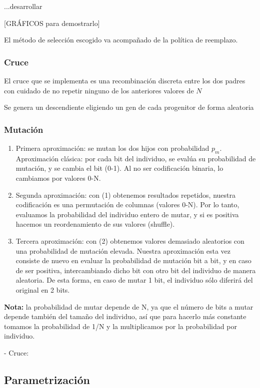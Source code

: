 \documentclass[12pt]{article}
\begin{document}
...desarrollar

[GRÁFICOS para demostrarlo]

El método de selección escogido va acompañado de la política de reemplazo.

\subsubsection{Cruce}

El cruce que se implementa es una recombinación discreta entre los dos padres con cuidado de no repetir ninguno de los anteriores valores de $N$ 

Se genera un descendiente eligiendo un gen de cada progenitor de forma aleatoria

\subsubsection{Mutación}

\begin{enumerate}
    \item Primera aproximación: se mutan los dos hijos con probabilidad $p_m$. Aproximación clásica: por cada bit del individuo, se evalúa su probabilidad de mutación, y se cambia el bit (0-1). Al no ser codificación binaria, lo cambiamos por valores 0-N.
    \item Segunda aproximación: con (1) obtenemos resultados repetidos, nuestra codificación es una permutación de columnas (valores 0-N). Por lo tanto, evaluamos la probabilidad del individuo entero de mutar, y si es positiva hacemos un reordenamiento de sus valores (shuffle).
    \item Tercera aproximación: con (2) obtenemos valores demasiado aleatorios con una probabilidad de mutación elevada. Nuestra aproximación esta vez consiste de nuevo en evaluar la probabilidad de mutación bit a bit, y en caso de ser positiva, intercambiando dicho bit con otro bit del individuo de manera aleatoria. De esta forma, en caso de mutar 1 bit, el individuo sólo diferirá del original en 2 bits.
    
\end{enumerate}
\textbf{Nota:}
la probabilidad de mutar depende de N, ya que el número de bits a mutar depende también del tamaño del individuo, así que para hacerlo más constante tomamos la probabilidad de 1/N y la multiplicamos por la probabilidad por individuo.


- Cruce:


\subsection{Parametrización}
\end{document}
